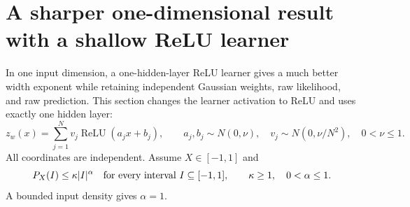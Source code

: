 \section{A sharper one-dimensional result with a shallow ReLU learner}
\label{sec:univariate-Gaussian}
In one input dimension, a one-hidden-layer ReLU learner gives a much
better width exponent while retaining independent Gaussian weights,
raw likelihood, and raw prediction. This section changes the learner
activation to ReLU and uses exactly one hidden layer:
\[
 z_w(x)=\sum_{j=1}^Nv_j\operatorname{ReLU}(a_jx+b_j),\qquad
 a_j,b_j\sim N(0,\nu),\quad v_j\sim N(0,\nu/N^2),\quad0<\nu\le1.
\]
All coordinates are independent. Assume $X\in[-1,1]$ and
\begin{equation}
 P_X(I)\le\kappa |I|^\alpha
 \quad\hbox{for every interval }I\subseteq[-1,1],
 \qquad\kappa\ge1,\quad0<\alpha\le1.
 \label{eq:one-dimensional-regularity}
\end{equation}
A bounded input density gives $\alpha=1$.

